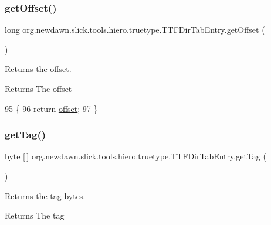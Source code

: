 \subsubsection{\texorpdfstring{get\+Offset()}{getOffset()}}
{\footnotesize\ttfamily long org.\+newdawn.\+slick.\+tools.\+hiero.\+truetype.\+T\+T\+F\+Dir\+Tab\+Entry.\+get\+Offset (\begin{DoxyParamCaption}{ }\end{DoxyParamCaption})\hspace{0.3cm}{\ttfamily [inline]}}

Returns the offset.

\begin{DoxyReturn}{Returns}
The offset 
\end{DoxyReturn}

\begin{DoxyCode}
95                             \{
96         \textcolor{keywordflow}{return} \mbox{\hyperlink{classorg_1_1newdawn_1_1slick_1_1tools_1_1hiero_1_1truetype_1_1_t_t_f_dir_tab_entry_a9bb77e4398e9b9a60789de3d96ac027c}{offset}};
97     \}
\end{DoxyCode}
\mbox{\label{classorg_1_1newdawn_1_1slick_1_1tools_1_1hiero_1_1truetype_1_1_t_t_f_dir_tab_entry_a5ecc2f0acfe7bfaf8ed66c12b0879a2c}} 
\subsubsection{\texorpdfstring{get\+Tag()}{getTag()}}
{\footnotesize\ttfamily byte \mbox{[}$\,$\mbox{]} org.\+newdawn.\+slick.\+tools.\+hiero.\+truetype.\+T\+T\+F\+Dir\+Tab\+Entry.\+get\+Tag (\begin{DoxyParamCaption}{ }\end{DoxyParamCaption})\hspace{0.3cm}{\ttfamily [inline]}}

Returns the tag bytes.

\begin{DoxyReturn}{Returns}
The tag 
\end{DoxyReturn}


